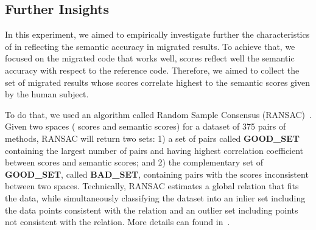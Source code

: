 \subsection{Further Insights}

In this experiment, we aimed to empirically investigate further the
characteristics of {\model} in reflecting the semantic accuracy in
migrated results. To achieve that, we focused on the migrated code
that {\model} works well, \ie {\model} scores reflect well the
semantic accuracy with respect to the reference code. Therefore, we
aimed to collect the set of migrated results whose {\model} scores
correlate highest to the semantic scores given by the human subject.

%


To do that, we used an algorithm called Random Sample Consensus
(RANSAC)~\cite{Fischler:1981:RSC:358669.358692}. Given two spaces
({\model} scores and semantic scores) for a dataset of 375 pairs of
methods, RANSAC will return two sets: 1) a set of pairs called {\bf
  GOOD\_SET} containing the largest number of pairs and having highest
correlation coefficient between {\model} scores and semantic scores;
and 2) the complementary set of {\bf GOOD\_SET}, called {\bf
  BAD\_SET}, containing pairs with the scores inconsistent between two
spaces. Technically, RANSAC estimates a global relation that fits the
data, while simultaneously classifying the dataset into an inlier set
including the data points consistent with the relation and an outlier
set including points not consistent with the relation. More details
can found in~\cite{Fischler:1981:RSC:358669.358692}.

%

